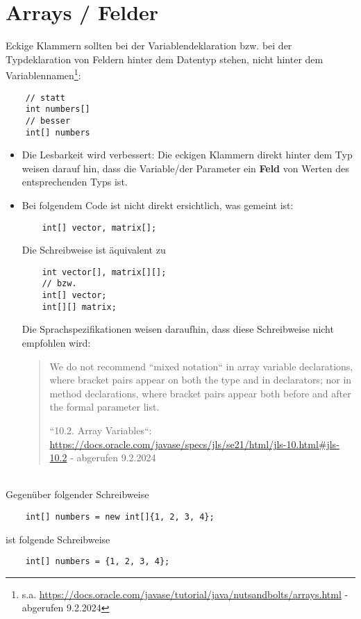 \section{Arrays / Felder}
Eckige Klammern sollten bei der Variablendeklaration {bzw.} bei der Typdeklaration von Feldern hinter dem Datentyp stehen, nicht hinter dem Variablennamen\footnote{
    s.a. \url{https://docs.oracle.com/javase/tutorial/java/nutsandbolts/arrays.html} - abgerufen 9.2.2024}:

\begin{verbatim}
    // statt
    int numbers[]
    // besser
    int[] numbers
\end{verbatim}

\begin{itemize}
    \item Die Lesbarkeit wird verbessert: Die eckigen Klammern direkt hinter dem Typ weisen darauf hin, dass die Variable/der Parameter ein \textbf{Feld} von Werten des entsprechenden Typs ist.
    \item Bei folgendem Code ist nicht direkt ersichtlich, was gemeint ist:
    \begin{verbatim}
    int[] vector, matrix[];
    \end{verbatim}
    Die Schreibweise ist äquivalent zu
    \begin{verbatim}
    int vector[], matrix[][];
    // bzw.
    int[] vector;
    int[][] matrix;
    \end{verbatim}
    Die Sprachspezifikationen weisen daraufhin, dass diese Schreibweise nicht empfohlen wird:
    \blockquote[{``10.2. Array Variables``: \url{https://docs.oracle.com/javase/specs/jls/se21/html/jls-10.html#jls-10.2} - abgerufen 9.2.2024}]{
        We do not recommend ``mixed notation`` in array variable declarations, where bracket pairs appear on both the type and in declarators; nor in method declarations, where bracket pairs appear both before and after the formal parameter list.
    }
\end{itemize}\\

\noindent
Gegenüber folgender Schreibweise

\begin{verbatim}
    int[] numbers = new int[]{1, 2, 3, 4};
\end{verbatim}

ist folgende Schreibweise

\begin{verbatim}
    int[] numbers = {1, 2, 3, 4};
\end{verbatim}

